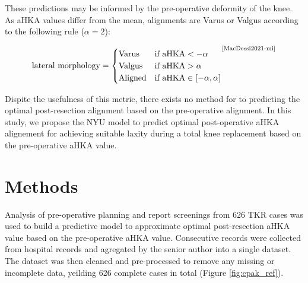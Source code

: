 \documentclass{article}
\begin{document}
These predictions may be informed by the pre-operative deformity of the knee.
As aHKA values differ from the mean, alignments are Varus or Valgus according to the following rule ($\alpha=2$):

\[\text{lateral morphology}=
	\begin{cases}
		\text{Varus} & \text{if } \text{aHKA} < -\alpha \\
		\text{Valgus} & \text{if } \text{aHKA} > \alpha \\
		\text{Aligned} & \text{if } \text{aHKA} \in [-\alpha, \alpha]
	\end{cases} ^ \text{\cite{MacDessi2021-mi}}
\]

Dispite the usefulness of this metric, there exists no method for to predicting the optimal post-resection alignment based on the pre-operative alignment.
In this study, we propose the NYU model to predict optimal post-operative aHKA alignement 
for achieving suitable laxity during a total knee replacement based on the pre-operative aHKA value.

\section{Methods}

Analysis of pre-operative planning and report screenings from 626 TKR cases was used to build a predictive model
to approximate optimal post-resection aHKA value based on the pre-operative aHKA value.
Consecutive records were collected from hospital records and agregated by the senior author into a single dataset.
The dataset was then cleaned and pre-processed to remove any missing or incomplete data, yeilding 626 complete cases in total (Figure \ref{fig:cpak_ref}).
\end{document}
